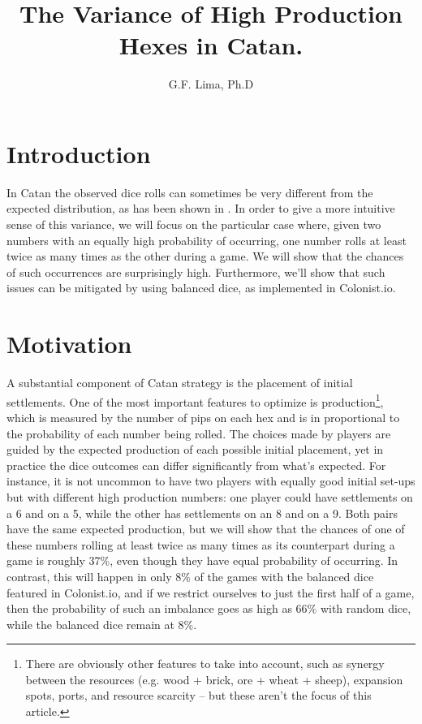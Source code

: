 \documentclass[11pt]{article}
\title{The Variance of High Production Hexes in Catan.}
\author{G.F. Lima, Ph.D}
\begin{document}
\maketitle
\section{Introduction}

In Catan the observed dice rolls can sometimes be very different from the expected distribution, as has been shown in \cite{DBD}. In order to give a more intuitive sense of this variance, we will focus on the particular case where, given two numbers with an equally high probability of occurring, one number rolls at least twice as many times as the other during a game. We will show that the chances of such occurrences are surprisingly high. Furthermore, we'll show that such issues can be mitigated by using balanced dice, as implemented in Colonist.io.


\section{Motivation}


A substantial component of Catan strategy is the placement of initial settlements. One of the most important features to optimize is production\footnote{There are obviously other features to take into account, such as synergy between the resources (e.g. wood + brick, ore + wheat + sheep), expansion spots, ports, and resource scarcity -- but these aren't the focus of this article.}, which is measured by the number of pips on each hex and is in proportional to the probability of each number being rolled. The choices made by players are guided by the expected production of each possible initial placement, yet in practice the dice outcomes can differ significantly from what's expected. For instance, it is not uncommon to have two players with equally good initial set-ups but with different high production numbers: one player could have settlements on a 6 and on a 5, while the  other has settlements on an 8 and on a 9. Both pairs have the same expected production, but we will show that the chances of one of these numbers rolling at least twice as many times as its counterpart during a game is roughly 37\%, even though they have equal probability of occurring. In contrast, this will happen in only $8\%$ of the games with the balanced dice featured in Colonist.io, and if we restrict ourselves to just the first half of a game, then the probability of such an imbalance goes as high as $66\%$ with random dice, while the balanced dice remain at $8\%$.
\end{document}
